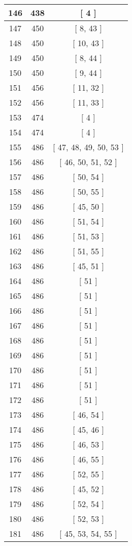 \begin{center}
\begin{longtable}[H]{|| c c c ||}
\hline
146 & 438 & [ 4 ] \\ 
\hline
147 & 450 & [ 8, 43 ] \\ 
\hline
148 & 450 & [ 10, 43 ] \\ 
\hline
149 & 450 & [ 8, 44 ] \\ 
\hline
150 & 450 & [ 9, 44 ] \\ 
\hline
151 & 456 & [ 11, 32 ] \\ 
\hline
152 & 456 & [ 11, 33 ] \\ 
\hline
153 & 474 & [ 4 ] \\ 
\hline
154 & 474 & [ 4 ] \\ 
\hline
155 & 486 & [ 47, 48, 49, 50, 53 ] \\ 
\hline
156 & 486 & [ 46, 50, 51, 52 ] \\ 
\hline
157 & 486 & [ 50, 54 ] \\ 
\hline
158 & 486 & [ 50, 55 ] \\ 
\hline
159 & 486 & [ 45, 50 ] \\ 
\hline
160 & 486 & [ 51, 54 ] \\ 
\hline
161 & 486 & [ 51, 53 ] \\ 
\hline
162 & 486 & [ 51, 55 ] \\ 
\hline
163 & 486 & [ 45, 51 ] \\ 
\hline
164 & 486 & [ 51 ] \\ 
\hline
165 & 486 & [ 51 ] \\ 
\hline
166 & 486 & [ 51 ] \\ 
\hline
167 & 486 & [ 51 ] \\ 
\hline
168 & 486 & [ 51 ] \\ 
\hline
169 & 486 & [ 51 ] \\ 
\hline
170 & 486 & [ 51 ] \\ 
\hline
171 & 486 & [ 51 ] \\ 
\hline
172 & 486 & [ 51 ] \\ 
\hline
173 & 486 & [ 46, 54 ] \\ 
\hline
174 & 486 & [ 45, 46 ] \\ 
\hline
175 & 486 & [ 46, 53 ] \\ 
\hline
176 & 486 & [ 46, 55 ] \\ 
\hline
177 & 486 & [ 52, 55 ] \\ 
\hline
178 & 486 & [ 45, 52 ] \\ 
\hline
179 & 486 & [ 52, 54 ] \\ 
\hline
180 & 486 & [ 52, 53 ] \\ 
\hline
181 & 486 & [ 45, 53, 54, 55 ] \\ 

\end{longtable}
\end{center}
